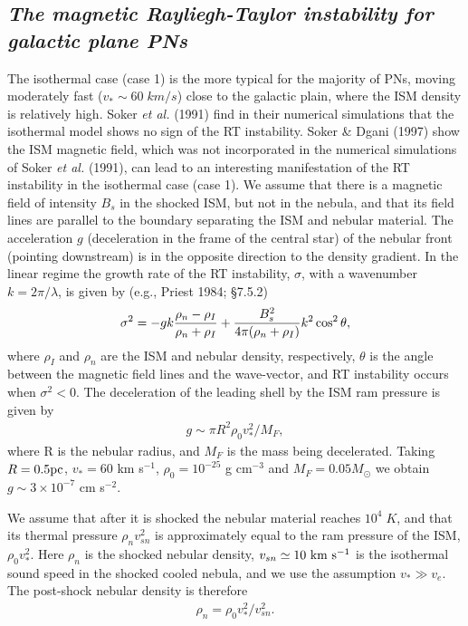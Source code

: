 \documentclass{article}
\def \s{\rm{s}}
\def \km{\rm{km}}
\def \s{~\rm{s}}
\def \km{~\rm{km}}
\def \pc{\rm{pc}}
\begin{document}
\subsection {\it The magnetic Rayliegh-Taylor instability for galactic plane PNs}
The isothermal case (case 1) is the more typical for the majority of PNs,
moving moderately fast ($v_\ast\sim 60\;km/s$) close to the galactic plain,
where the ISM density is relatively high.
Soker {\it et al.} (1991) find in their numerical simulations that the
isothermal model shows no sign of the RT instability.
Soker \& Dgani (1997) show   the ISM magnetic field, which was not incorporated in
the numerical simulations of Soker {\it et al.} (1991), can lead to an
interesting manifestation of the RT instability in the isothermal case  (case 1).
We assume that there is a magnetic field of intensity $B_s$ in the shocked
ISM, but not in the nebula, and that its field lines are parallel to the
boundary separating the ISM and nebular material.
The acceleration $g$ (deceleration in the frame of the central star)
of the nebular front (pointing downstream) is in the opposite
direction to the density gradient.
In the linear regime the growth rate of the RT instability, $\sigma$, with a
wavenumber $k = 2 \pi / \lambda$, is given by  (e.g., Priest 1984; \S 7.5.2)
\begin{eqnarray}
\sigma^2 = - g k {
{\rho_n-\rho_I}
\over
{\rho_n+\rho_I}}
+
{{B_s^2}\over{4 \pi ( \rho_n+\rho_I )}}
k^2 \cos^2 \theta,
\end{eqnarray}
 where $\rho_I$ and $\rho_n$ are the ISM and nebular density, respectively,
$\theta$ is the angle between the magnetic field lines and the
wave-vector, and RT instability occurs when $\sigma^2 < 0$.
The deceleration of the leading shell
{ { by the ISM ram pressure}} is given by
\begin{eqnarray}
g\sim \pi R^2 \rho_0 v_\ast^2/M_F,
\end{eqnarray}
where R is the nebular radius, and $M_F$ is the mass being decelerated.
Taking $R=0.5 \pc$, $v_\ast=60$ km s$^{-1}$, $\rho_0= 10^{-25}$ g cm$^{-3}$ and
$M_F=0.05 M_\odot$
we obtain $g \sim 3\times 10^{-7}$ cm  s$^{-2}$.


We assume that after it is shocked the nebular material reaches
$10^4\;K$, and that its thermal pressure $\rho_n v_{sn}^2$ is approximately
equal to the ram pressure of the ISM,  $\rho_0 v_\ast^2$.
 Here $\rho_{n}$ is the shocked nebular density,
$v_{sn} \simeq 10 \km \s^{-1}$ is the isothermal sound speed in the
shocked cooled nebula, and we use the assumption $v_\ast \gg v_e$.
 The post-shock nebular density is therefore
\begin{eqnarray}
\rho_{n} = \rho_0 v_\ast^2/ v_{sn}^2.
\end{eqnarray}
\end{document}

